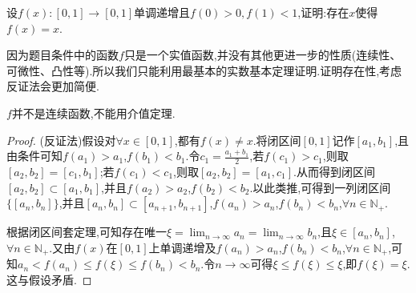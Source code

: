 \documentclass[lang=cn,newtx,10pt,scheme=chinese]{elegantbook}
\begin{document}
\begin{example}
设\(f(x):[0,1]\to[0,1]\)单调递增且\(f(0)>0,f(1)<1\),证明:存在\(x\)使得\(f(x)=x\).
\end{example}
\begin{note}
因为题目条件中的函数$f$只是一个实值函数,并没有其他更进一步的性质(连续性、可微性、凸性等).所以我们只能利用最基本的实数基本定理证明.证明存在性,考虑反证法会更加简便.
\end{note}
\begin{remark}
$f$并不是连续函数,不能用介值定理.
\end{remark}
\begin{proof}
(反证法)假设对$\forall x\in[0,1]$,都有$f(x)\ne x$.将闭区间\([0,1]\)记作\([a_1,b_1]\),且由条件可知\(f(a_1)>a_1\),\(f(b_1)<b_1\).令\(c_1=\frac{a_1 + b_1}{2}\),若\(f(c_1)>c_1\),则取\([a_2,b_2]=[c_1,b_1]\);若\(f(c_1)<c_1\),则取\([a_2,b_2]=[a_1,c_1]\).从而得到闭区间\([a_2,b_2]\subset [a_1,b_1]\),并且\(f(a_2)>a_2\),\(f(b_2)<b_2\).以此类推,可得到一列闭区间\(\{[a_n,b_n]\}\),并且\([a_n,b_n]\subset [a_{n + 1},b_{n + 1}]\),\(f(a_n)>a_n\),\(f(b_n)<b_n\),\(\forall n\in\mathbb{N}_+\).

根据闭区间套定理,可知存在唯一\(\xi=\lim_{n\rightarrow\infty}a_n=\lim_{n\rightarrow\infty}b_n\),且\(\xi\in [a_n,b_n]\),\(\forall n\in\mathbb{N}_+\).又由\(f(x)\)在\([0,1]\)上单调递增及\(f(a_n)>a_n\),\(f(b_n)<b_n\),\(\forall n\in\mathbb{N}_+\),可知\(a_n<f(a_n)\leqslant f(\xi)\leqslant f(b_n)<b_n\).令\(n\rightarrow\infty\)可得\(\xi\leqslant f(\xi)\leqslant\xi\),即\(f(\xi)=\xi\).这与假设矛盾.
\end{proof}
\end{document}
